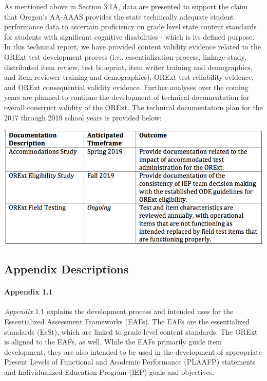 \documentclass[]{article}
\let\oldparagraph\paragraph
\renewcommand{\paragraph}[1]{\oldparagraph{#1}\mbox{}}
\begin{document}
As mentioned above in Section 3.1A, data are presented to support the
claim that Oregon's AA-AAAS provides the state technically adequate
student performance data to ascertain proficiency on grade level state
content standards for students with significant cognitive disabilities -
which is its defined purpose. In this technical report, we have provided
content validity evidence related to the ORExt test development process
(i.e., essentialization process, linkage study, distributed item review,
test blueprint, item writer training and demographics, and item reviewer
training and demographics), ORExt test reliability evidence, and ORExt
consequential validity evidence. Further analyses over the coming years
are planned to continue the development of technical documentation for
overall construct validity of the ORExt. The technical documentation
plan for the 2017 through 2019 school years is provided below:

\FloatBarrier
\includegraphics{tifs/techdocplan.png}

\subsection{Appendix Descriptions}\label{appendix-descriptions}

\paragraph{Appendix 1.1}\label{appendix-1.1}

\emph{Appendix} 1.1 explains the development process and intended uses
for the Essentialized Assessment Frameworks (EAFs). The EAFs are the
essentialized standards (EsSt), which are linked to grade level content
standards. The ORExt is aligned to the EAFs, as well. While the EAFs
primarily guide item development, they are also intended to be used in
the development of appropriate Present Levels of Functional and Academic
Performance (PLAAFP) statements and Individualized Education Program
(IEP) goals and objectives. \newpage
\end{document}
